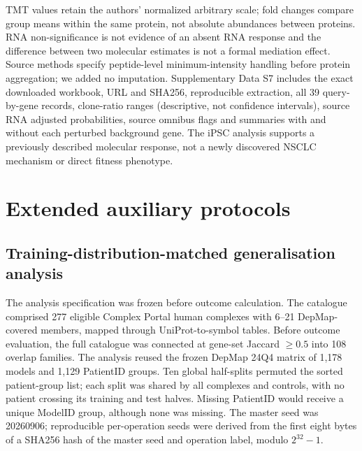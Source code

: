 \documentclass[11pt,letterpaper]{article}
\begin{document}
TMT values retain the authors' normalized arbitrary scale; fold changes compare group means within the same protein, not absolute abundances between proteins. RNA non-significance is not evidence of an absent RNA response and the difference between two molecular estimates is not a formal mediation effect. Source methods specify peptide-level minimum-intensity handling before protein aggregation; we added no imputation. Supplementary Data S7 includes the exact downloaded workbook, URL and SHA256, reproducible extraction, all 39 query-by-gene records, clone-ratio ranges (descriptive, not confidence intervals), source RNA adjusted probabilities, source omnibus flags and summaries with and without each perturbed background gene. The iPSC analysis supports a previously described molecular response, not a newly discovered NSCLC mechanism or direct fitness phenotype.

\clearpage\section*{Extended auxiliary protocols}
\subsection*{Training-distribution-matched generalisation analysis}
The analysis specification was frozen before outcome calculation.
The catalogue comprised 277 eligible Complex Portal human complexes with
6--21 DepMap-covered members, mapped through UniProt-to-symbol tables. Before outcome evaluation, the full catalogue was connected at gene-set
Jaccard $\geq0.5$ into 108 overlap families. The analysis reused the frozen
DepMap 24Q4 matrix of 1{,}178 models and 1{,}129 PatientID groups. Ten global
half-splits permuted the sorted patient-group list; each split was shared by
all complexes and controls, with no patient crossing its training and test
halves. Missing PatientID would receive a unique ModelID group, although none
was missing. The master seed was 20260906; reproducible per-operation seeds
were derived from the first eight bytes of a SHA256 hash of the master seed
and operation label, modulo $2^{32}-1$.
\end{document}
